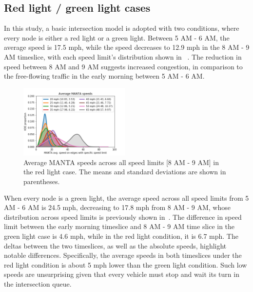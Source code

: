 \documentclass[final]{IEEEtran}
\begin{document}


\subsection{Red light / green light cases}
In this study, a basic intersection model is adopted with two conditions, where every node is either a red light or a green light. Between 5 AM - 6 AM, the average speed is 17.5 mph, while the speed decreases to 12.9 mph in the 8 AM - 9 AM timeslice, with each speed limit's distribution shown in ~. The reduction in speed between 8 AM and 9 AM suggests increased congestion, in comparison to the free-flowing traffic in the early morning between 5 AM - 6 AM. 

\begin{figure}
    \centering
    \includegraphics[width=0.49\textwidth]{figs/avg_vel_red_light_8to9.png}
    \caption{Average MANTA speeds across all speed limits [8 AM - 9 AM] in the red light case. The means and standard deviations are shown in parentheses.}
    \label{fig:velocities_red_light}
\end{figure}

When every node is a green light, the average speed across all speed limits from 5 AM - 6 AM is 24.5 mph, decreasing to 17.8 mph from 8 AM - 9 AM, whose distribution across speed limits is previously shown in~. The difference in speed limit between the early morning timeslice and 8 AM - 9 AM time slice in the green light case is 4.6 mph, while in the red light condition, it is 6.7 mph. The deltas between the two timeslices, as well as the absolute speeds, highlight notable differences. Specifically, the average speeds in both timeslices under the red light condition is about 5 mph lower than the green light condition. Such low speeds are unsurprising given that every vehicle must stop and wait its turn in the intersection queue.
\end{document}
